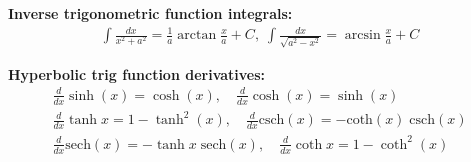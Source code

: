 \documentclass[10pt,landscape]{article}
\makeatletter
\renewcommand{\section}{\@startsection{section}{1}{0mm}%
                                {-1ex}%
                                {0.5ex}%
                                {\normalfont\large\bfseries}}
\makeatother
\begin{document}
\begin{multicols}{3}
\par \textbf{Inverse trigonometric function integrals:}
\begin{gather*}
\int \frac{dx}{x^2 + a^2} = \frac{1}{a} \arctan \frac{x}{a} + C, \; \int \frac{dx}{\sqrt{a^2 - x^2}} = \arcsin \frac{x}{a} + C 
\end{gather*}

\par \textbf{Hyperbolic trig function derivatives:}
\begin{gather*}
\frac{d}{dx} \sinh (x) = \cosh (x), \quad \frac{d}{dx}\cosh (x) = \sinh (x)\\
\frac{d}{dx}\tanh x = 1 - \tanh^2 (x), \quad \frac{d}{dx}\text{csch} (x) = - \text{coth}(x) \; \text{csch}(x) \\
\frac{d}{dx}\text{sech} (x) = - \tanh x \; \text{sech} (x), \quad
\frac{d}{dx}\coth x = 1 - \coth^2 (x)
\end{gather*}









\end{multicols}
\end{document}

